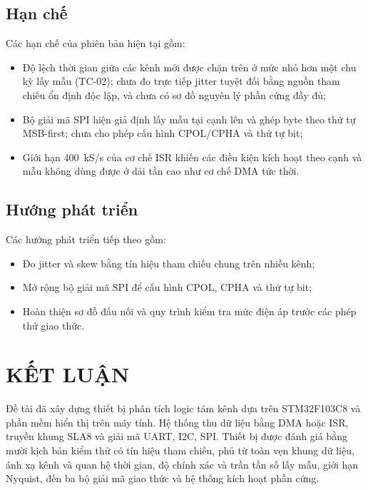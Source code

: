 \section{Hạn chế}\label{hux1ea1n-chux1ebf}

Các hạn chế của phiên bản hiện tại gồm:
\begin{itemize}
\item Độ lệch thời gian giữa các kênh mới được chặn trên ở mức nhỏ hơn một chu kỳ lấy mẫu (TC-02); chưa đo trực tiếp jitter tuyệt đối bằng nguồn tham chiếu ổn định độc lập, và chưa có sơ đồ nguyên lý phần cứng đầy đủ;
\item Bộ giải mã SPI hiện giả định lấy mẫu tại cạnh lên và ghép byte theo thứ tự MSB-first; chưa cho phép cấu hình CPOL/CPHA và thứ tự bit;
\item Giới hạn 400~kS/s của cơ chế ISR khiến các điều kiện kích hoạt theo cạnh và mẫu không dùng được ở dải tần cao như cơ chế DMA tức thời.
\end{itemize}

\section{Hướng phát triển}\label{hux1b0ux1edbng-phuxe1t-triux1ec3n}

Các hướng phát triển tiếp theo gồm:
\begin{itemize}
\item Đo jitter và skew bằng tín hiệu tham chiếu chung trên nhiều kênh;
\item Mở rộng bộ giải mã SPI để cấu hình CPOL, CPHA và thứ tự bit;
\item Hoàn thiện sơ đồ đấu nối và quy trình kiểm tra mức điện áp trước các phép thử giao thức.
\end{itemize}

\chapter{KẾT LUẬN}\label{kux1ebft-luux1eadn}

Đề tài đã xây dựng thiết bị phân tích logic tám kênh dựa trên STM32F103C8 và phần mềm hiển thị trên máy tính. Hệ thống thu dữ liệu bằng DMA hoặc ISR, truyền khung SLA8 và giải mã UART, I2C, SPI. Thiết bị được đánh giá bằng mười kịch bản kiểm thử có tín hiệu tham chiếu, phủ từ toàn vẹn khung dữ liệu, ánh xạ kênh và quan hệ thời gian, độ chính xác và trần tần số lấy mẫu, giới hạn Nyquist, đến ba bộ giải mã giao thức và hệ thống kích hoạt phần cứng.

